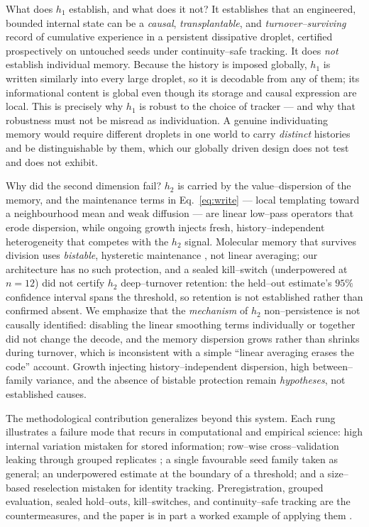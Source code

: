 \documentclass[11pt]{article}
\begin{document}
What does $h_1$ establish, and what does it not? It establishes that an engineered, bounded internal state can be a
\emph{causal}, \emph{transplantable}, and \emph{turnover--surviving} record of cumulative experience in a persistent
dissipative droplet, certified prospectively on untouched seeds under continuity--safe tracking. It does \emph{not}
establish individual memory. Because the history is imposed globally, $h_1$ is written similarly into every large
droplet, so it is decodable from any of them; its informational content is global even though its storage and causal
expression are local. This is precisely why $h_1$ is robust to the choice of tracker --- and why that robustness
must not be misread as individuation. A genuine individuating memory would require different droplets in one world
to carry \emph{distinct} histories and be distinguishable by them, which our globally driven design does not test
and does not exhibit.

Why did the second dimension fail? $h_2$ is carried by the value--dispersion of the memory, and the maintenance
terms in Eq.~\eqref{eq:write} --- local templating toward a neighbourhood mean and weak diffusion --- are linear
low--pass operators that erode dispersion, while ongoing growth injects fresh, history--independent heterogeneity
that competes with the $h_2$ signal. Molecular memory that survives division uses \emph{bistable}, hysteretic
maintenance \citep{gardner2000,elowitz2000,ferrell2002,ptashne2004}, not linear averaging; our architecture has no
such protection, and a sealed kill--switch (underpowered at $n=12$) did not certify $h_2$ deep--turnover retention: the held--out estimate's $95\%$ confidence interval spans the threshold, so retention is not established rather than confirmed absent. We emphasize that the \emph{mechanism} of $h_2$ non--persistence is not causally identified: disabling the linear smoothing terms individually or together did not change the decode, and the memory dispersion grows rather than shrinks during turnover, which is inconsistent with a simple ``linear averaging erases the code'' account. Growth injecting history--independent dispersion, high between--family variance, and the absence of bistable protection remain \emph{hypotheses}, not established causes.

The methodological contribution generalizes beyond this system. Each rung illustrates a failure mode that recurs in
computational and empirical science: high internal variation mistaken for stored information; row--wise
cross--validation leaking through grouped replicates \citep{kaufman2012}; a single favourable seed family taken as
general; an underpowered estimate at the boundary of a threshold; and a size--based reselection mistaken for
identity tracking. Preregistration, grouped evaluation, sealed hold--outs, kill--switches, and continuity--safe
tracking are the countermeasures, and the paper is in part a worked example of applying them
\citep{nosek2018,popper1959,efron1979}.
\end{document}
